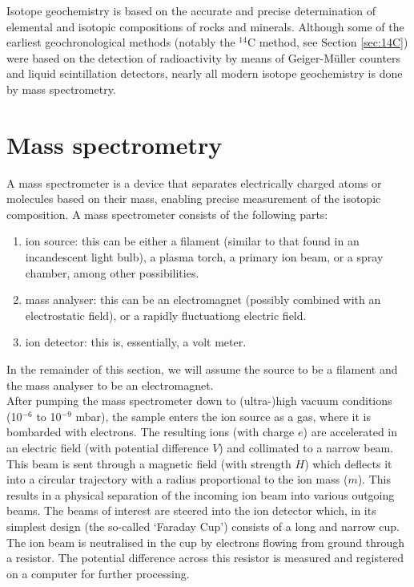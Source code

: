 \documentclass{book}
\begin{document}
Isotope geochemistry is based on the accurate and precise
determination of elemental and isotopic compositions of rocks and
minerals.  Although some of the earliest geochronological methods
(notably the $^{14}$C method, see Section \ref{sec:14C}) were based on
the detection of radioactivity by means of Geiger-M\"{u}ller counters
and liquid scintillation detectors, nearly all modern isotope
geochemistry is done by mass spectrometry.

\section{Mass spectrometry}
\label{sec:mass-specs}

A mass spectrometer is a device that separates electrically charged
atoms or molecules based on their mass, enabling precise measurement
of the isotopic composition. A mass spectrometer consists of the
following parts:

\begin{enumerate}
\item ion source: this can be either a filament (similar to that found
  in an incandescent light bulb), a plasma torch, a primary ion beam,
  or a spray chamber, among other possibilities.
\item mass analyser: this can be an electromagnet (possibly combined
  with an electrostatic field), or a rapidly fluctuationg electric
  field.
\item ion detector: this is, essentially, a volt meter.
\end{enumerate}

In the remainder of this section, we will assume the source to be a
filament and the mass analyser to be an electromagnet. \\

After pumping the mass spectrometer down to (ultra-)high vacuum
conditions (10$^{-6}$ to 10$^{-9}$ mbar), the sample enters the ion
source as a gas, where it is bombarded with electrons.  The resulting
ions (with charge $e$) are accelerated in an electric field (with
potential difference $V$) and collimated to a narrow beam. This beam
is sent through a magnetic field (with strength $H$) which deflects it
into a circular trajectory with a radius proportional to the ion mass
($m$).  This results in a physical separation of the incoming ion beam
into various outgoing beams. The beams of interest are steered into
the ion detector which, in its simplest design (the so-called `Faraday
Cup') consists of a long and narrow cup. The ion beam is neutralised
in the cup by electrons flowing from ground through a resistor. The
potential difference across this resistor is measured and registered
on a computer for further processing.\\
\end{document}
